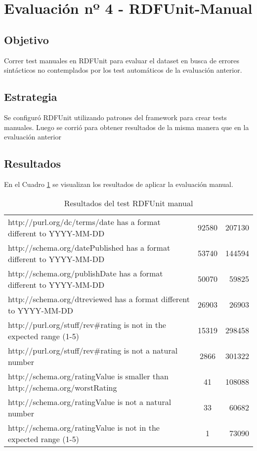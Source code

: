 \section{Evaluación nº 4 - RDFUnit-Manual}
\label{section:evaluacion-manual}

\subsection*{Objetivo} Correr test manuales en RDFUnit para evaluar el dataset en busca de errores sintácticos no contemplados por los test
automáticos de la evaluación anterior.

\subsection*{Estrategia} Se configuró RDFUnit utilizando patrones del framework para crear tests manuales. Luego se corrió para obtener resultados
de la misma manera que en la evaluación anterior

\subsection*{Resultados}

En el Cuadro \ref{table:RDFUnitManual} se visualizan los resultados de aplicar la evaluación manual.
\begin{table}[h]
\begin{tabular}{| l | c | r | }
http://purl.org/dc/terms/date has a format different to YYYY-MM-DD & 92580 & 207130\\
http://schema.org/datePublished has a format different to YYYY-MM-DD & 53740 & 144594\\
http://schema.org/publishDate has a format different to YYYY-MM-DD & 50070 & 59825\\
http://schema.org/dtreviewed has a format different to YYYY-MM-DD & 26903 & 26903\\ 
http://purl.org/stuff/rev\#rating is not in the expected range (1-5) & 15319 & 298458\\
http://purl.org/stuff/rev\#rating is not a natural number & 2866 & 301322\\
http://schema.org/ratingValue is smaller than http://schema.org/worstRating & 41 & 108088 \\
http://schema.org/ratingValue is not a natural number & 33 & 60682\\
http://schema.org/ratingValue is not in the expected range (1-5) & 1 & 73090 
\end{tabular}
\caption{Resultados del test RDFUnit manual}
\label{table:RDFUnitManual}
\end{table}

